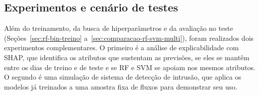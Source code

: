 \documentclass[
    12pt,                %
    openright,           %
    oneside,             %
    a4paper,             %
    english,             %
    brazil               %
]{abntex2}
\makeatletter
\renewcommand{\ABNTEXfontereduzida}{\fontsize{10}{12}\selectfont}
\renewcommand{\legend}[1]{%
  \M@gettitle{#1}%
  \memlegendinfo{#1}%
  \par
  \begingroup
    \@parboxrestore
    \if@minipage
      \@setminipage
    \fi
    \ABNTEXfontereduzida
    \captiondelim{\mbox{}}%
    \@makecaption{}{\ignorespaces #1}\par
  \endgroup}
\makeatother
\begin{document}




\subsection{Experimentos e cenário de testes}
\label{sec:experimentos}

Além do treinamento, da busca de hiperparâmetros e da avaliação no teste (Seções~\ref{sec:rf-bin-treino} a~\ref{sec:comparacao-rf-svm-multi}), foram realizados dois experimentos complementares. O primeiro é a análise de explicabilidade com SHAP, que identifica os atributos que sustentam as previsões, se eles se mantêm entre os dias de treino e de teste e se RF e SVM se apoiam nos mesmos atributos. O segundo é uma simulação de sistema de detecção de intrusão, que aplica os modelos já treinados a uma amostra fixa de fluxos para demonstrar seu uso.
\end{document}
